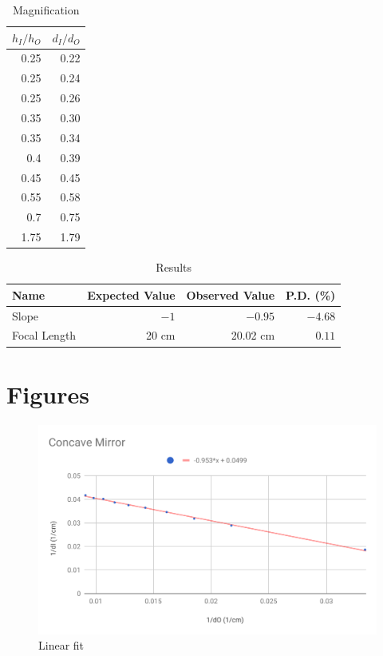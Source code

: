 %
\begin{table}[ht]
    \centering
    \begin{tabular}{|r|r|}
        \hline
        $h_{I} / h_{O}$ & $d_{I} / d_{O}$ \\
        \hline
        0.25 & 0.22 \\
        0.25 & 0.24 \\
        0.25 & 0.26 \\
        0.35 & 0.30 \\
        0.35 & 0.34 \\
        0.4 & 0.39 \\
        0.45 & 0.45 \\
        0.55 & 0.58 \\
        0.7 & 0.75 \\
        1.75 & 1.79 \\
        \hline
    \end{tabular}
    \caption{Magnification}
    \label{table.07.magnification}
\end{table}
%
\begin{table}[ht]
    \centering
    \begin{tabular}{|l|r|r|r|}
        \hline
        Name & Expected Value & Observed Value & P.D. (\%) \\
        \hline
        Slope & $-1$ & $-0.95$ & $-4.68$ \\
        Focal Length & 20 cm & 20.02 cm & $0.11$ \\
        \hline
    \end{tabular}
    \caption{Results}
    \label{table.07.results}
\end{table}
%
\newpage
\FloatBarrier
\section{Figures}
%
\begin{figure}[ht]
    \centering
    \includegraphics[scale=0.74]{image/07-mirrors/chart.pdf}
    \caption{Linear fit}
    \label{figure.07.chart}
\end{figure}
%